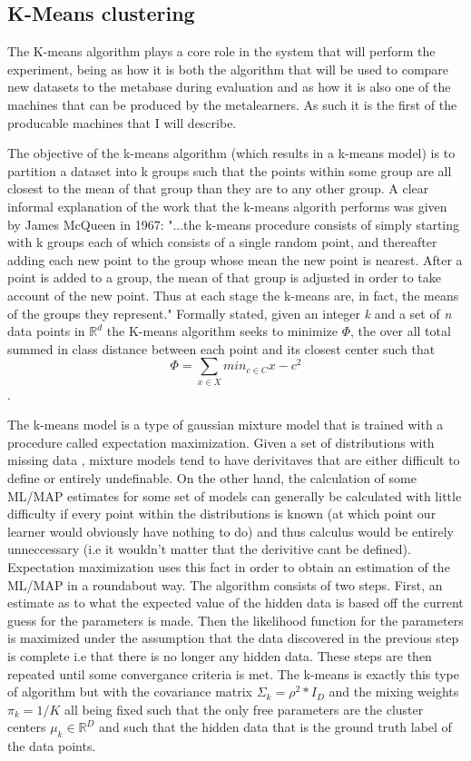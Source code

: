 \documentclass[a4paper,11pt]{article}
\begin{document}
  \subsection{K-Means clustering}
  The K-means algorithm plays a core role in the system that will perform the experiment, being as how
  it is both the algorithm that will be used to compare new datasets to the metabase during evaluation
  and as how it is also one of the machines that can be produced by the metalearners. As such it is the
  first of the producable machines that I will describe.

The objective of the k-means algorithm (which results in a k-means model) is to partition
a dataset into k groups such that the points within some group are all closest to
the mean of that group than they are to any other group. A clear
informal explanation of the work that the k-means algorith performs
was given by James McQueen in 1967: "...the k-means procedure
consists of simply starting with k groups each of which consists of a
single random point, and thereafter adding each new point to the
group whose mean the new point is nearest. After a point is added to
a group, the mean of that group is adjusted in order to take account
of the new point. Thus at each stage the k-means are, in fact, the
means of the groups they represent."\cite{McQueen} Formally stated,
given an integer \textit{k} and a set of \textit{n} data points in
$\mathbb{R}^{d}$ the K-means algorithm seeks to minimize $\Phi$, the
over all total summed in class distance between each point and its
closest center such that $$\Phi = \sum_{x \in X} min_{c \in C}\left. x-c \right.^{2} $$
\cite{Arthur}.

The k-means model is a type of gaussian mixture model that is trained with a procedure
called expectation maximization. Given a set of distributions with missing data
, mixture models tend to have derivitaves that are either difficult to define
or entirely undefinable. On the other hand, the calculation of some ML/MAP
estimates for some set of models can generally be calculated with little
difficulty if every point within the distributions is known (at which point our
learner would obviously have nothing to do) and thus calculus would be entirely
unneccessary (i.e it wouldn't matter that the derivitive cant be defined).
Expectation maximization uses this fact in order to obtain an estimation of the
ML/MAP in a roundabout way. The algorithm consists of two steps. First, an estimate as
to what the expected value of the hidden data is based off the current guess for the
parameters is made. Then the likelihood function for the parameters is maximized under
the assumption that the data discovered in the previous step is complete i.e that there
is no longer any hidden data. These steps are then repeated until some convergance criteria
is met. The k-means is exactly this type of algorithm but with the covariance matrix
$\Sigma_{k} = \rho^{2}*I_{D}$ and the mixing weights $\pi_{k} = 1/K$ all being fixed such
that the only free parameters are the cluster centers $\mu_{k} \in \mathbb{R}^{D}$
and such that the hidden data that is the ground truth label of the data points.
\end{document}
